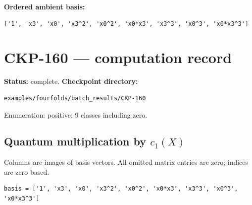 \documentclass[10pt,a4paper]{article}
\begin{document}
\textbf{Ordered ambient basis:}
\begin{lstlisting}
['1', 'x3', 'x0', 'x3^2', 'x0^2', 'x0*x3', 'x3^3', 'x0^3', 'x0*x3^3']
\end{lstlisting}

\clearpage\section*{CKP-160 --- computation record}
\textbf{Status:} complete.
\textbf{Checkpoint directory:}
\begin{lstlisting}
examples/fourfolds/batch_results/CKP-160
\end{lstlisting}

Enumeration: positive; 9 classes including zero.
\subsection*{Quantum multiplication by $c_1(X)$}
Columns are images of basis vectors. All omitted matrix entries are zero; indices are zero based.

\begin{lstlisting}
basis = ['1', 'x3', 'x0', 'x3^2', 'x0^2', 'x0*x3', 'x3^3', 'x0^3', 'x0*x3^3']
\end{lstlisting}
\end{document}
